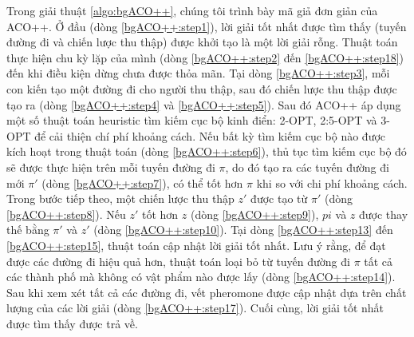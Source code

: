 Trong giải thuật \ref{algo:bgACO++}, chúng tôi trình bày mã giả đơn giản của ACO++. Ở đầu (dòng \ref{bgACO++:step1}), lời giải tốt nhất được tìm thấy (tuyến đường đi và chiến lược thu thập) được khởi tạo là một lời giải rỗng. Thuật toán thực hiện chu kỳ lặp của mình (dòng \ref{bgACO++:step2} đến \ref{bgACO++:step18}) đến khi điều kiện dừng chưa được thỏa mãn. Tại dòng \ref{bgACO++:step3}, mỗi con kiến tạo một đường đi cho người thu thập, sau đó chiến lược thu thập được tạo ra (dòng \ref{bgACO++:step4} và \ref{bgACO++:step5}). Sau đó ACO++ áp dụng một số thuật toán heuristic tìm kiếm cục bộ kinh điển: 2-OPT, 2:5-OPT và 3-OPT \cite{Crama1995} để cải thiện chí phí khoảng cách. Nếu bất kỳ tìm kiếm cục bộ nào được kích hoạt trong thuật toán (dòng \ref{bgACO++:step6}), thủ tục tìm kiếm cục bộ đó sẽ được thực hiện trên mỗi tuyến đường đi $\pi$, do đó tạo ra các tuyến đường đi mới $\pi'$ (dòng \ref{bgACO++:step7}), có thể tốt hơn $\pi$ khi so với chi phí khoảng cách. Trong bước tiếp theo, một chiến lược thu thập $z'$ được tạo từ $\pi'$ (dòng \ref{bgACO++:step8}). Nếu $z'$ tốt hơn $z$ (dòng \ref{bgACO++:step9}), $pi$ và $z$ được thay thế bằng $\pi'$ và $z'$ (dòng \ref{bgACO++:step10}). Tại dòng \ref{bgACO++:step13} đến \ref{bgACO++:step15}, thuật toán cập nhật lời giải tốt nhất. Lưu ý rằng, để đạt được các đường đi hiệu quả hơn, thuật toán loại bỏ từ tuyến đường đi $\pi$ tất cả các thành phố mà không có vật phẩm nào được lấy (dòng \ref{bgACO++:step14}). Sau khi xem xét tất cả các đường đi, vết pheromone được cập nhật dựa trên chất lượng của các lời giải (dòng \ref{bgACO++:step17}). Cuối cùng, lời giải tốt nhất được tìm thấy được trả về.

